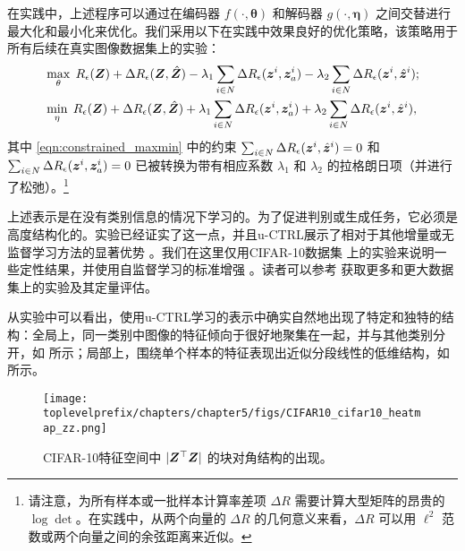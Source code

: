 \documentclass[../../book-main.tex]{subfiles}
\begin{document}
在实践中，上述程序可以通过在编码器 $f(\cdot,\bm \theta)$ 和解码器 $g(\cdot,\bm \eta)$ 之间交替进行最大化和最小化来优化。我们采用以下在实践中效果良好的优化策略，该策略用于所有后续在真实图像数据集上的实验：
\vspace{-1mm}
\begin{align}
  &  \max_{\theta}\; R_\epsilon(\bm{Z}) + \Delta{R_\epsilon(\bm{Z}, \hat{\bm{Z}})-\lambda_{1}\sum_{i\in N} \Delta R_\epsilon(\bm{z}^i, \bm{z}_{a}^i)} -\lambda_{2}\sum_{i\in N} \Delta R_\epsilon(\bm{z}^i, \hat{\bm{z}}^i) \label{eqn:constrained_max}; \\
   & \min_{\eta}\; R_\epsilon(\bm{Z}) + \Delta{R_\epsilon(\bm{Z}, \hat{\bm{Z}})+\lambda_{1}\sum_{i\in N} \Delta R_\epsilon(\bm{z}^i, \bm{z}_{a}^i)+ \lambda_{2}\sum_{i\in N} \Delta R_\epsilon(\bm{z}^i, \hat{\bm{z}}^i)} \label{eqn:constrained_min}, 
\end{align}
其中 \eqref{eqn:constrained_maxmin} 中的约束 $\sum_{i\in N} \Delta R_\epsilon(\bm{z}^i, \hat{\bm{z}}^i) = 0$ 和 $\sum_{i\in N} \Delta R_\epsilon(\bm{z}^i, \bm{z}_{a}^i) = 0$ 已被转换为带有相应系数 $\lambda_{1}$ 和 $\lambda_{2}$ 的拉格朗日项（并进行了松弛）。\footnote{请注意，为所有样本或一批样本计算率差项 $\Delta R$ 需要计算大型矩阵的昂贵的 $\log\det$。在实践中，从两个向量的 $\Delta R$ 的几何意义来看，$\Delta R$ 可以用 $\ell^2$ 范数或两个向量之间的余弦距离来近似。}

上述表示是在没有类别信息的情况下学习的。为了促进判别或生成任务，它必须是高度结构化的。实验已经证实了这一点，并且u-CTRL展示了相对于其他增量或无监督学习方法的显著优势 \cite{pmlr-v234-tong24a}。我们在这里仅用CIFAR-10数据集 \cite{krizhevsky2014cifar} 上的实验来说明一些定性结果，并使用自监督学习的标准增强 \cite{chen2020simple}。读者可以参考 \cite{pmlr-v234-tong24a} 获取更多和更大数据集上的实验及其定量评估。

从实验中可以看出，使用u-CTRL学习的表示中确实自然地出现了特定和独特的结构：全局上，同一类别中图像的特征倾向于很好地聚集在一起，并与其他类别分开，如  所示；局部上，围绕单个样本的特征表现出近似分段线性的低维结构，如  所示。

\begin{figure}[t]
     \footnotesize
     \centering
    \texttt{[image: \\toplevelprefix/chapters/chapter5/figs/CIFAR10\_cifar10\_heatmap\_zz.png]}
    \caption{\small CIFAR-10特征空间中 $|\bm{Z}^\top \bm{Z}|$ 的块对角结构的出现。}
    \label{fig:heatmap_z}
\end{figure}
\end{document}

